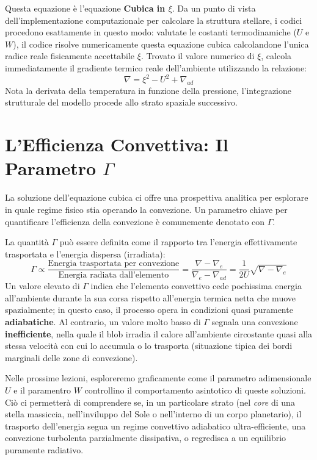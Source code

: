 Questa equazione è l'equazione \textbf{Cubica in $\xi$}.
Da un punto di vista dell'implementazione computazionale per calcolare la struttura stellare, i codici procedono esattamente in questo modo: valutate le costanti termodinamiche ($U$ e $W$), il codice risolve numericamente questa equazione cubica calcolandone l'unica radice reale fisicamente accettabile $\xi$. Trovato il valore numerico di $\xi$, calcola immediatamente il gradiente termico reale dell'ambiente utilizzando la relazione:
\begin{equation}
\nabla = \xi^2 - U^2 + \nabla_{ad}
\end{equation}
Nota la derivata della temperatura in funzione della pressione, l'integrazione strutturale del modello procede allo strato spaziale successivo.

\section{L'Efficienza Convettiva: Il Parametro $\Gamma$}

La soluzione dell'equazione cubica ci offre una prospettiva analitica per esplorare in quale regime fisico stia operando la convezione. Un parametro chiave per quantificare l'efficienza della convezione è comunemente denotato con $\Gamma$.

La quantità $\Gamma$ può essere definita come il rapporto tra l'energia effettivamente trasportata e l'energia dispersa (irradiata):
\begin{equation}
\Gamma \propto \frac{\text{Energia trasportata per convezione}}{\text{Energia radiata dall'elemento}} = \frac{\nabla - \nabla_e}{\nabla_e - \nabla_{ad}} = \frac{1}{2U} \sqrt{\nabla - \nabla_e}
\end{equation}
Un valore elevato di $\Gamma$ indica che l'elemento convettivo cede pochissima energia all'ambiente durante la sua corsa rispetto all'energia termica netta che muove spazialmente; in questo caso, il processo opera in condizioni quasi puramente \textbf{adiabatiche}. Al contrario, un valore molto basso di $\Gamma$ segnala una convezione \textbf{inefficiente}, nella quale il blob irradia il calore all'ambiente circostante quasi alla stessa velocità con cui lo accumula o lo trasporta (situazione tipica dei bordi marginali delle zone di convezione).

Nelle prossime lezioni, esploreremo graficamente come il parametro adimensionale $U$ e il paramentro $W$ controllino il comportamento asintotico di queste soluzioni. Ciò ci permetterà di comprendere se, in un particolare strato (nel \textit{core} di una stella massiccia, nell'inviluppo del Sole o nell'interno di un corpo planetario), il trasporto dell'energia segua un regime convettivo adiabatico ultra-efficiente, una convezione turbolenta parzialmente dissipativa, o regredisca a un equilibrio puramente radiativo.